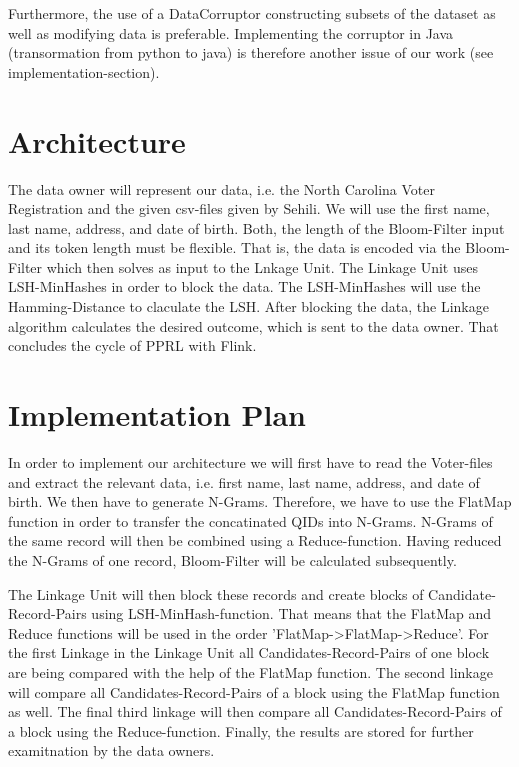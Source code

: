 \documentclass[10pt]{article}
\begin{document}
            Furthermore, the use of a DataCorruptor constructing subsets of the dataset as well as
            modifying data is preferable. Implementing the corruptor in Java (transormation from python to java)
            is therefore another issue of our work (see implementation-section).


    \section{Architecture}


        The data owner will represent our data, i.e. the North Carolina Voter Registration and the
        given csv-files given by Sehili. We will use the first name, last name, address, and date of birth.
        Both, the length of the Bloom-Filter input and its token length must be flexible. That is, the data is encoded
        via the Bloom-Filter which then solves as input to the Lnkage Unit.
        The Linkage Unit uses LSH-MinHashes in order to block the data. The LSH-MinHashes will use the Hamming-Distance
        to claculate the LSH. After blocking the data, the Linkage algorithm calculates the desired outcome,
        which is sent to the data owner. That concludes the cycle of PPRL with Flink.

    \section{Implementation Plan}


        In order to implement our architecture we will first have to read the Voter-files and
        extract the relevant data, i.e. first name, last name, address, and date of birth.
        We then have to generate N-Grams. Therefore, we have to use the FlatMap function
        in order to transfer the concatinated QIDs into N-Grams. N-Grams of the same record will then be
        combined using a Reduce-function.
        Having reduced the N-Grams of one record, Bloom-Filter will be calculated subsequently.

        The Linkage Unit will then block these records and create blocks of Candidate-Record-Pairs
        using LSH-MinHash-function. That means that the FlatMap and Reduce functions will be used in
        the order 'FlatMap->FlatMap->Reduce'.
        For the first Linkage in the Linkage Unit all Candidates-Record-Pairs of one block are
        being compared with the help of the FlatMap function.
        The second linkage will compare all Candidates-Record-Pairs of a block using the
        FlatMap function as well. The final third linkage will then compare all
        Candidates-Record-Pairs of a block using the Reduce-function.
        Finally, the results are stored for further examitnation by the data owners.



\end{document}
